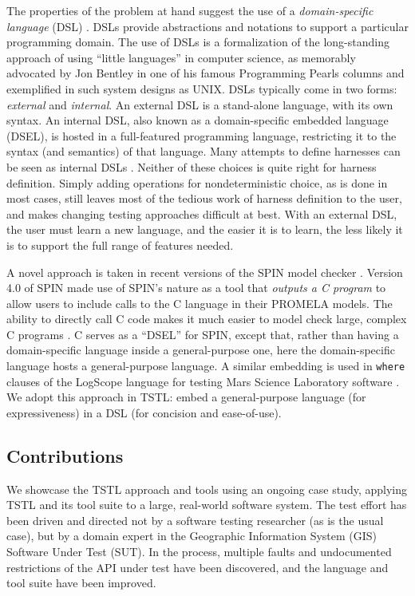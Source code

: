 The properties of the problem at hand suggest the use of a
\emph{domain-specific language} (DSL) \cite{ISOLA12}.  DSLs
\cite{Fow10} provide abstractions and notations to support a
particular programming domain. The use of DSLs is a formalization of
the long-standing approach of using ``little languages'' in computer
science, as memorably advocated by Jon Bentley in one of his famous
Programming Pearls columns \cite{LitLang} and exemplified in such system
designs as UNIX.  DSLs typically come in two forms: \emph{external}
and \emph{internal}.  An external DSL is a stand-alone language, with
its own syntax.  An internal DSL, also known as a domain-specific
embedded language (DSEL), is hosted in a full-featured programming
language, restricting it to the syntax (and semantics) of that
language.  Many attempts to define harnesses can be seen as internal
DSLs \cite{UDITA,ISSRE12,JPF2,CBMCp,KLEE}.  Neither of these choices
is quite right for harness definition.  Simply adding operations for
nondeterministic choice, as is done in most cases, still leaves most of
the tedious work of harness definition to the user, and makes changing
testing approaches difficult at best.  With an external DSL, the user
must learn a new language, and the easier it is to learn, the less
likely it is to support the full range of features needed.

A novel approach is taken in recent versions of the SPIN model checker
\cite{SPIN}.  Version 4.0 of SPIN \cite{ModelDriven} made use of
SPIN's nature as a tool that \emph{outputs a C program} to allow users
to include calls to the C language in their PROMELA models.  The
ability to directly call C code makes it much easier to model check
large, complex C programs \cite{AMAI,ModelCode}.  C serves as a
``DSEL'' for SPIN, except that, rather than having a domain-specific
language inside a general-purpose one, here the domain-specific
language hosts a general-purpose language.  A similar embedding is
used in {\tt where} clauses of the LogScope language for testing Mars
Science Laboratory software \cite{scriptstospecs}.  We adopt this
approach in TSTL: embed a general-purpose language (for expressiveness) in a
DSL (for concision and ease-of-use).

\subsection{Contributions}

We showcase the TSTL
approach and tools using an ongoing case study, applying TSTL and
its tool suite to a large, real-world software system.
The test effort has been driven and directed not by a software testing
researcher (as is the usual case), but by a domain expert in the
Geographic Information System (GIS)
Software Under Test (SUT).  In the process, multiple faults and
undocumented restrictions of the API under test have been discovered,
and the language and tool suite have been improved.

